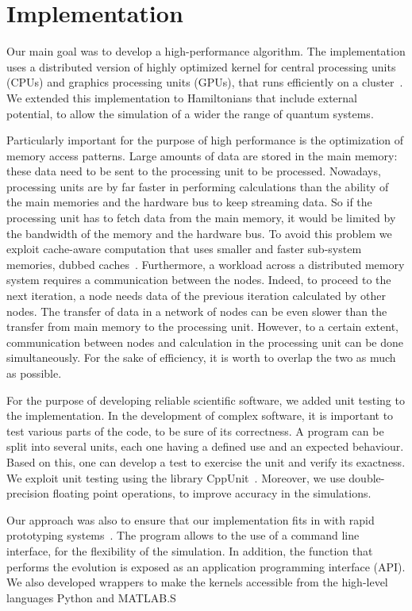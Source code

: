 \chapter{Implementation}
Our main goal was to develop a high-performance algorithm. The implementation uses a distributed version of highly optimized kernel for central processing units (CPUs) and graphics processing units (GPUs), that runs efficiently on a cluster~\citep{Wittek20131165}. We extended this implementation to Hamiltonians that include external potential, to allow the simulation of a wider the range of quantum systems. 

Particularly important for the purpose of high performance is the optimization of memory access patterns. Large amounts of data are stored in the main memory: these data need to be sent to the processing unit to be processed. Nowadays, processing units are by far faster in performing calculations than the ability of the main memories and the hardware bus to keep streaming data. So if the processing unit has to fetch data from the main memory, it would be limited by the bandwidth of the memory and the hardware bus. To avoid this problem we exploit cache-aware computation that uses smaller and faster sub-system memories, dubbed caches~\citep{Handy}. 
Furthermore, a workload across a distributed memory system requires a communication between the nodes. Indeed, to proceed to the next iteration, a node needs data of the previous iteration calculated by other nodes. The transfer of data in a network of nodes can be even slower than the transfer from main memory to the processing unit. However, to a certain extent, communication between nodes and calculation in the processing unit can be done simultaneously. For the sake of efficiency, it is worth to overlap the two as much as possible.

For the purpose of developing reliable scientific software, we added unit testing to the implementation. In the development of complex software, it is important to test various parts of the code, to be sure of its correctness. A program can be split into several units, each one having a defined use and an expected behaviour. Based on this, one can develop a test to exercise the unit and verify its exactness. We exploit unit testing using the library CppUnit~\citep{CPPUnit}. Moreover, we use double-precision floating point operations, to improve accuracy in the simulations.

Our approach was also to ensure that our implementation fits in with rapid prototyping
systems~\citep{SmithMF}. The program allows to the use of a command line interface, for the flexibility of the simulation. In addition, the function that performs the evolution is exposed as an application programming interface (API). We also developed wrappers to make the kernels accessible from the  high-level languages Python and MATLAB.S

